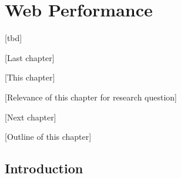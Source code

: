 \chapter{Web Performance}
\label{chapter:web_performance}





[tbd]


[Last chapter]



[This chapter]





[Relevance of this chapter for research question]





[Next chapter]





[Outline of this chapter]













\section{Introduction} %
\label{section:web_performance_introduction}


